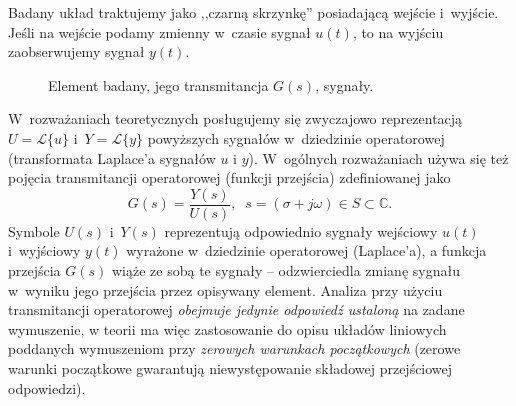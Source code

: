 \documentclass[paper=a4,DIV=12]{lpas}
\begin{document}
\begin{appendices}
  Badany układ traktujemy jako ,,czarną skrzynkę'' posiadającą wejście i~wyjście.
  Jeśli na wejście podamy zmienny w~czasie sygnał $u(t)$, to na wyjściu
  zaobserwujemy sygnał $y(t)$.
  \begin{figure}[htbp]
    \centering
    \caption{Element badany, jego transmitancja $G(s)$, sygnały.}
    \label{fig:6TEOB}
  \end{figure}
  W~rozważaniach teoretycznych posługujemy się zwyczajowo reprezentacją
  $U = \mathscr{L}\{u\}$ i~$Y = \mathscr{L}\{y\}$ powyższych sygnałów
  w~dziedzinie operatorowej (transformata Laplace'a sygnałów $u$ i $y$).
  W~ogólnych rozważaniach używa się też pojęcia transmitancji operatorowej
  (funkcji przejścia) zdefiniowanej jako
  \begin{equation}
    G\left(s\right) = \frac{Y(s)}{U(s)}, \;\;
    s = \left( \sigma + j \omega \right) \in S \subset \mathbb{C}.
    \label{eq:34IJQ}
  \end{equation}
  Symbole $U\left(s\right)$ i~$Y\left(s\right)$ reprezentują odpowiednio sygnały
  wejściowy $u(t)$ i~wyjściowy $y(t)$ wyrażone w~dziedzinie
  operatorowej (Laplace'a), a funkcja przejścia $G(s)$ wiąże ze sobą te sygnały --
  odzwierciedla zmianę sygnału w~wyniku jego przejścia przez opisywany element.
  Analiza przy użyciu transmitancji operatorowej {\em obejmuje jedynie odpowiedź
  ustaloną} na zadane wymuszenie, w teorii ma więc zastosowanie do opisu układów
  liniowych poddanych wymuszeniom przy {\em zerowych warunkach początkowych}
  (zerowe warunki początkowe gwarantują niewystępowanie składowej przejściowej
  odpowiedzi).


\end{appendices}
\end{document}
